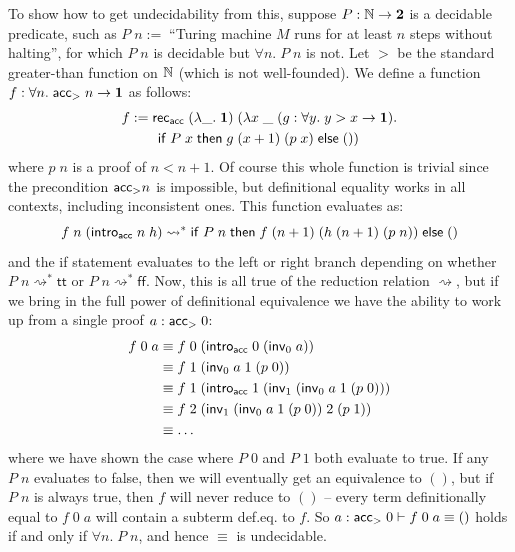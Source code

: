 To show how to get undecidability from this, suppose $P:\mathbb{N}\to\bf 2$ is a decidable predicate, such as $P\;n:=\;$``Turing machine $M$ runs for at least $n$ steps without halting'', for which $P\;n$ is decidable but $\forall n.\;P\;n$ is not. Let $>$ be the standard greater-than function on $\mathbb{N}$ (which is not well-founded). We define a function $f:\forall n.\;\mathsf{acc}_{>}\;n\to\bf 1$ as follows:
\begin{align*}
f&:=\mathsf{rec}_{\mathsf{acc}}\;(\lambda\_.\;{\bf 1})\;(\lambda x\;\_\;(g:\forall y.\;y>x\to{\bf 1}).\\
&\qquad\mathsf{if}\;P\;x\;\mathsf{then}\;g\;(x+1)\;(p\;x)\;\mathsf{else}\;())
\end{align*}
where $p\;n$ is a proof of $n<n+1$. Of course this whole function is trivial since the precondition $\mathsf{acc}_{>}n$ is impossible, but definitional equality works in all contexts, including inconsistent ones. This function evaluates as:
$$f\;n\;(\mathsf{intro}_{\mathsf{acc}}\;n\;h)\rightsquigarrow^*\mathsf{if}\;P\;n\;\mathsf{then}\;f\;(n+1)\;(h\;(n+1)\;(p\;n))\;\mathsf{else}\;()$$
and the \textsf{if} statement evaluates to the left or right branch depending on whether $P\;n\rightsquigarrow^*\mathsf{tt}$ or $P\;n\rightsquigarrow^*\mathsf{ff}$. Now, this is all true of the reduction relation $\rightsquigarrow$, but if we bring in the full power of definitional equivalence we have the ability to work up from a single proof $a:\mathsf{acc}_{>}\;0$:
\begin{align*}
f\;0\;a&\equiv f\;0\;(\mathsf{intro}_{\mathsf{acc}}\;0\;(\mathsf{inv}_0\;a))\\
&\equiv f\;1\;(\mathsf{inv}_0\;a\;1\;(p\;0))\\
&\equiv f\;1\;(\mathsf{intro}_{\mathsf{acc}}\;1\;(\mathsf{inv}_1\;(\mathsf{inv}_0\;a\;1\;(p\;0)))\\
&\equiv f\;2\;(\mathsf{inv}_1\;(\mathsf{inv}_0\;a\;1\;(p\;0))\;2\;(p\;1))\\
&\equiv\dots
\end{align*}
where we have shown the case where $P\;0$ and $P\;1$ both evaluate to true. If any $P\;n$ evaluates to false, then we will eventually get an equivalence to $()$, but if $P\;n$ is always true, then $f$ will never reduce to $()$ -- every term definitionally equal to $f\;0\;a$ will contain a subterm def.eq. to $f$. So $a:\mathsf{acc}_{>}\;0\vdash f\;0\;a\equiv()$ holds if and only if $\forall n.\;P\;n$, and hence $\equiv$ is undecidable.

